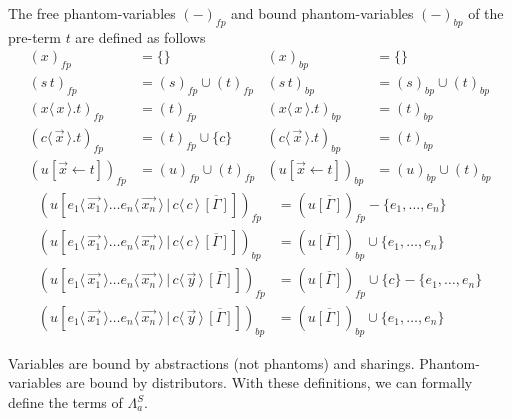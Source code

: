 \documentclass[a4paper,UKenglish,cleveref, autoref]{lipics-v2019}
\newcommand{\FALC}{\Lambda^{S}_{a}}
\newcommand{\fp}[1]{(#1)_{fp}}
\newcommand{\bp}[1]{(#1)_{bp}}
\newcommand{\set}[1]{ \{ #1 \} }
\newcommand{\app}[2]{#1 \, #2}
\newcommand{\fake}[3]{#1 \langle \, #2 \, \rangle . #3}
\newcommand{\share}[3]{#1 [#2 \leftarrow #3]}
\newcommand{\dist}[5]{#1 [ #2 \, \vert \, \fakedist{#4}{#5} \, #3 ]}
\newcommand{\fakedist}[2]{#1 \langle \, #2 \, \rangle}
\begin{document}
\begin{definition}
\label{def:freeboundphan}
The free phantom-variables $\fp{-}$ and bound phantom-variables $\bp{-}$ of the pre-term $t$ are defined as follows
\begingroup
\allowdisplaybreaks
	\begin{align*}
		\fp{x} &= \set{} & \bp{x} &= \set{} \\
		\fp{\app{s}{t}} &= \fp{s} \cup \fp{t} & \bp{\app{s}{t}} &= \bp{s} \cup \bp{t} \\
		\fp{\fake{x}{x}{t}} &= \fp{t} & \bp{\fake{x}{x}{t}} &= \bp{t}  \\
		\fp{\fake{c}{\vec{x}}{t}} &= \fp{t} \cup \set{c}& \bp{\fake{c}{\vec{x}}{t}} &= \bp{t} \\
		\fp{\share{u}{\vec{x}}{t}} &= \fp{u} \cup \fp{t} & \bp{\share{u}{\vec{x}}{t}} &= \bp{u} \cup \bp{t}
	\end{align*}
	\begin{align*}
	\fp{\dist{u}{\fakedist{e_{1}}{\vec{x_{1}}} \dots \fakedist{e_{n}}{\vec{x_{n}}}}{\overline{[\Gamma]}}{c}{c}} &= \fp{u \overline{[\Gamma]}} - \set{e_{1}, \dots, e_{n}} \\
	\bp{\dist{u}{\fakedist{e_{1}}{\vec{x_{1}}} \dots \fakedist{e_{n}}{\vec{x_{n}}}}{\overline{[\Gamma]}}{c}{c}} &= \bp{u \overline{[\Gamma]}} \cup \set{e_{1}, \dots, e_{n}} \\
	\fp{\dist{u}{\fakedist{e_{1}}{\vec{x_{1}}} \dots \fakedist{e_{n}}{\vec{x_{n}}}}{\overline{[\Gamma]}}{c}{\vec{y}}} &= \fp{u \overline{[\Gamma]}} \cup \set{c} - \set{e_{1}, \dots, e_{n}} \\
	\bp{\dist{u}{\fakedist{e_{1}}{\vec{x_{1}}} \dots \fakedist{e_{n}}{\vec{x_{n}}}}{\overline{[\Gamma]}}{c}{\vec{y}}} &= \bp{u \overline{[\Gamma]}} \cup \set{e_{1}, \dots, e_{n}}
	\end{align*}
\endgroup
\end{definition}

\noindent Variables are bound by abstractions (not phantoms) and sharings. Phantom-variables are bound by distributors. With these definitions, we can formally define the terms of $\FALC$.
\end{document}
